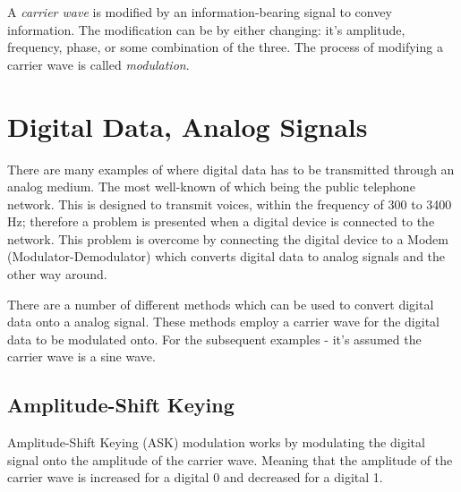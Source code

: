A \textit{carrier wave} is modified by an information-bearing signal to convey information. The modification can be by either changing: it's amplitude, frequency, phase, or some combination of the three. The process of modifying a carrier wave is called \textit{modulation}. 

\section{Digital Data, Analog Signals}
There are many examples of where digital data has to be transmitted through an analog medium. The most well-known of which being the public telephone network. This is designed to transmit voices, within the frequency of 300 to 3400 Hz; therefore a problem is presented when a digital device is connected to the network. This problem is overcome by connecting the digital device to a Modem (Modulator-Demodulator) which converts digital data to analog signals and the other way around. 

There are a number of different methods which can be used to convert digital data onto a analog signal. These methods employ a carrier wave for the digital data to be modulated onto. For the subsequent examples - it's assumed the carrier wave is a sine wave. 

\subsection{Amplitude-Shift Keying}
Amplitude-Shift Keying (ASK) modulation works by modulating the digital signal onto the amplitude of the carrier wave. Meaning that the amplitude of the carrier wave is increased for a digital 0 and decreased for a digital 1. 

